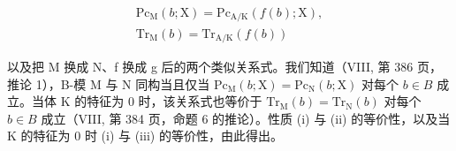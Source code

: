 \[
\begin{array}{c} \mathrm {Pc_ {M}} (b; \mathrm{X}) = \mathrm {Pc_ {A / K}} (f (b); \mathrm{X}), \\ \mathrm{Tr} _ {\mathrm{M}} (b) = \mathrm{Tr} _ {\mathrm{A/K}} (f (b)) \end{array}
\]

以及把 M 换成 N、f 换成 g 后的两个类似关系式。我们知道（VIII, 第 386 页，推论 1），B-模 M 与 N 同构当且仅当 \(\mathrm{Pc}_{\mathrm{M}}(b;\mathrm{X})=\mathrm{Pc}_{\mathrm{N}}(b;\mathrm{X})\) 对每个 \(b\in B\) 成立。当体 K 的特征为 0 时，该关系式也等价于 \(\mathrm{Tr}_{\mathrm{M}}(b)=\mathrm{Tr}_{\mathrm{N}}(b)\) 对每个 \(b\in B\) 成立（VIII, 第 384 页，命题 6 的推论）。性质 (i) 与 (ii) 的等价性，以及当 K 的特征为 0 时 (i) 与 (iii) 的等价性，由此得出。

